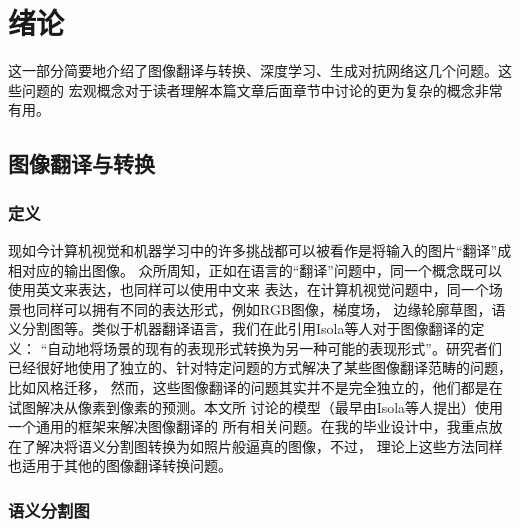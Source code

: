 \documentclass[supercite]{HustGraduPaper}
\theoremstyle{definition}
\begin{document}
\tableofcontents[level=3]
\clearpage


\section{绪论}

这一部分简要地介绍了图像翻译与转换、深度学习、生成对抗网络这几个问题。这些问题的
宏观概念对于读者理解本篇文章后面章节中讨论的更为复杂的概念非常有用。

\subsection{图像翻译与转换}
\subsubsection{定义}

现如今计算机视觉和机器学习中的许多挑战都可以被看作是将输入的图片“翻译”成相对应的输出图像。
众所周知，正如在语言的“翻译”问题中，同一个概念既可以使用英文来表达，也同样可以使用中文来
表达，在计算机视觉问题中，同一个场景也同样可以拥有不同的表达形式，例如RGB图像，梯度场，
边缘轮廓草图，语义分割图等。类似于机器翻译语言，我们在此引用Isola等人对于图像翻译的定义：
“自动地将场景的现有的表现形式转换为另一种可能的表现形式”\cite{pix2pix2016}。研究者们
已经很好地使用了独立的、针对特定问题的方式解决了某些图像翻译范畴的问题，比如风格迁移\cite{gatys2015neural}，
然而，这些图像翻译的问题其实并不是完全独立的，他们都是在试图解决从像素到像素的预测。本文所
讨论的模型（最早由Isola等人\cite{pix2pix2016}提出）使用一个通用的框架来解决图像翻译的
所有相关问题。在我的毕业设计中，我重点放在了解决将语义分割图转换为如照片般逼真的图像，不过，
理论上这些方法同样也适用于其他的图像翻译转换问题。

\subsubsection{语义分割图}
\end{document}
